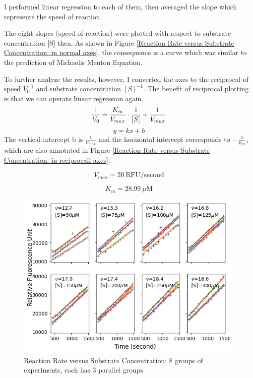\documentclass{report}
\begin{document}
I performed linear regression to each of them, then averaged the slope which represents the speed of reaction.

The eight slopes (speed of reaction) were plotted with respect to substrate concentration [S] then.
As shown in Figure \ref{Reaction Rate versus Substrate Concentration: in normal axes}, the consequence is a curve which was similar to the prediction of Michaelis Menton Equation.

To further analyze the results, however, I converted the axes to the reciprocal of speed $V_0^{-1}$ and substrate concentration $[S]^{-1}$.
The benefit of reciprocal plotting is that we can operate linear regression again.
$$
\frac{1}{V_0}=\frac{K_m}{V_{max}}\cdot \frac{1}{[S]}+\frac{1}{V_{max}}\\
$$
$$
y=kx+b
$$
The vertical intercept b is $\frac{1}{V_{max}}$ and the horizontal intercept corresponds to $-\frac{1}{K_m}$, which are also annotated in Figure \ref{Reaction Rate versus Substrate Concentration: in reciprocall axes}.

$$
V_{max}=20 \ \text{RFU/second}
$$

$$
K_{m}=28.99 \ \mu \text{M}
$$


\begin{figure}
    \centering
    \includegraphics[width=1\linewidth]{../Figures/substrate1.png}
    \caption{Reaction Rate versus Substrate Concentration: 8 groups of experiments, each has 3 parallel groups}
    \label{Reaction Rate versus Substrate Concentration: 8 groups of experiments}
\end{figure}
\end{document}
